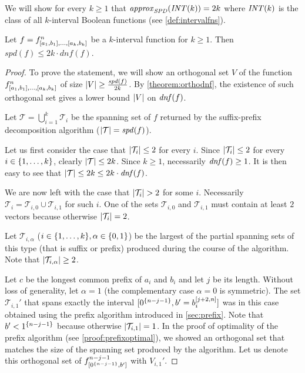 We will show for every $k \geq 1$
that $\mathit{approx}_{\mathit{SPD}} (\mathit{INT} (k)) = 2k$
where $\mathit{INT} (k)$ is the class of all $k$-interval Boolean functions
(see \cref{def:intervalfns}).

\begin{theorem}
\label{theorem:2kapproxratio}
\label{theorem:spd2kapprox}
Let $f = f^{n}_{[a_1, b_1], \ldots, [a_{k}, b_{k}]}$ be a $k$-interval function for $k \geq 1$.
Then $spd(f) \leq 2k \cdot \mathit{dnf}(f)$.
\end{theorem}

\begin{proof}
To prove the statement,
we will show an orthogonal set $V$ of the function
$f^n_{[a_1, b_1], \ldots, [a_k, b_k]}$
of size
$\lvert V\rvert \geq \frac{\mathit{spd} (f)}{2k}$.
By \cref{theorem:orthodnf},
the existence of such orthogonal set
gives a lower bound $\lvert V\rvert$
on $\mathit{dnf} (f)$.

Let $\mathcal{T} = \bigcup_{i=1}^k{\mathcal{T}_i}$ be the spanning set of $f$
returned by the suffix-prefix decomposition algorithm
($\lvert\mathcal{T}\rvert = \mathit{spd} (f)$).

Let us first consider the case that
$\lvert\mathcal{T}_i\rvert \leq 2$ for every $i$.
Since $\lvert\mathcal{T}_i\rvert \leq 2$
for every $i \in \{1, \ldots, k\}$,
clearly $\lvert\mathcal{T}\rvert \leq 2k$.
Since $k \geq 1$,
necessarily $\mathit{dnf} (f) \geq 1$.
It is then easy to see that
$\lvert\mathcal{T}\rvert
\leq 2k \leq 2k \cdot \mathit{dnf} (f)$.

We are now left with the case that
$\lvert\mathcal{T}_i\rvert > 2$ for some $i$.
Necessarily $\mathcal{T}_i
= \mathcal{T}_{i,0} \cup \mathcal{T}_{i,1}$
for such $i$.
One of the sets
$\mathcal{T}_{i,0}$ and $\mathcal{T}_{i,1}$
must contain at least $2$ vectors
because otherwise $\lvert\mathcal{T}_i\rvert = 2$.

Let $\mathcal{T}_{i, \alpha}$
($i \in \{1, \ldots, k\}, \alpha \in \{0, 1\}$)
be the largest
of the partial spanning sets of this type
(that is suffix or prefix)
produced during the course of the algorithm.
Note that $\lvert\mathcal{T}_{i,\alpha}\rvert \geq 2$.

Let $c$ be the longest common prefix
of $a_i$ and $b_i$
and let $j$ be its length.
Without loss of generality,
let $\alpha = 1$
(the complementary case $\alpha = 0$ is symmetric).
The set $\mathcal{T}_{i, 1}'$
that spans exactly
the interval
$[0^{\{n-j-1\}}, b' = b_i^{[j+2, n]}]$
was in this case obtained
using the prefix algorithm
introduced in \cref{sec:prefix}.
Note that $b' < 1^{\{n-j-1\}}$
because otherwise $\lvert\mathcal{T}_{i,1}\rvert = 1$.
In the proof of optimality of the prefix algorithm
(see \cref{proof:prefixoptimal}),
we showed an orthogonal set that matches the size
of the spanning set produced by the algorithm.
Let us denote this orthogonal set of $f^{n-j-1}_{[0^{\{n-j-1\}}, b']}$ with $V_{i, 1}'$.


\end{proof}
